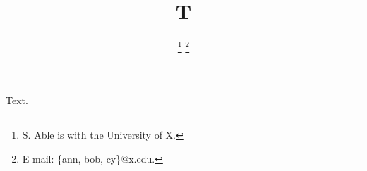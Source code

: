 \documentclass[conference]{IEEEtran}
\begin{document}
\title{T}
\author{
\thanks{S. Able is with the University of X.}
\thanks{E-mail: \{ann, bob, cy\}@x.edu.}}
\maketitle
Text.
\end{document}
